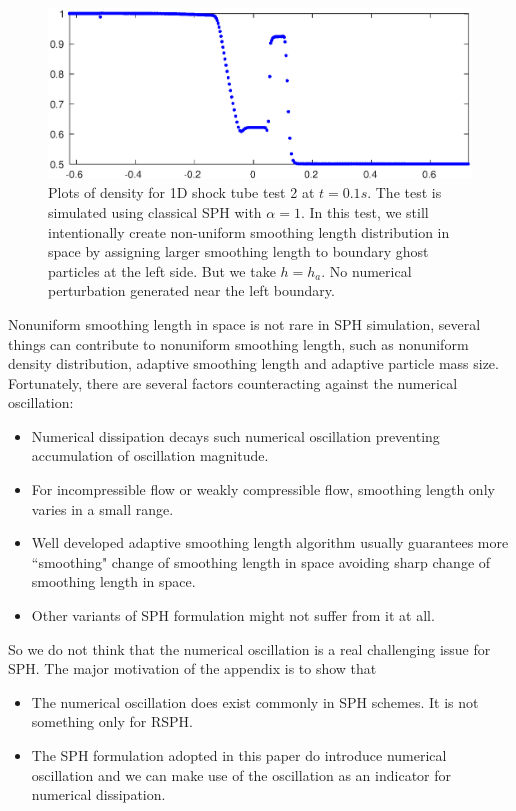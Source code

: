 \documentclass[preprint,12pt,authoryear]{elsarticle}
\begin{document}
\begin{figure}[H]
\centering
\includegraphics[width=0.90 \textwidth]{App-Figure/Perturbation-ME0-tp1}
\caption{Plots of density for 1D shock tube test 2 at $t=0.1s$. The test is simulated using classical SPH with $\alpha = 1$. In this test, we still intentionally create non-uniform smoothing length distribution in space by assigning larger smoothing length to boundary ghost particles at the left side. But we take $h=h_a$. No numerical perturbation generated near the left boundary.}    
\label{fig:Perturbation-ME0-tp1}
\end{figure}



Nonuniform smoothing length in space is not rare in SPH simulation, several things can contribute to nonuniform smoothing length, such as nonuniform density distribution, adaptive smoothing length and adaptive particle mass size. Fortunately, there are several factors counteracting against the numerical oscillation:
\begin{itemize}
\item Numerical dissipation decays such numerical oscillation preventing accumulation of oscillation magnitude.
\item For incompressible flow or weakly compressible flow, smoothing length only varies in a small range.
\item Well developed adaptive smoothing length algorithm usually guarantees more ``smoothing" change of smoothing length in space avoiding sharp change of smoothing length in space.
\item Other variants of SPH formulation might not suffer from it at all.
\end{itemize}
So we do not think that the numerical oscillation is a real challenging issue for SPH. The major motivation of the appendix is to show that 
\begin{itemize}
\item The numerical oscillation does exist commonly in SPH schemes. It is not something only for RSPH.
\item The SPH formulation adopted in this paper do introduce numerical oscillation and we can make use of the oscillation as an indicator for numerical dissipation.
\end{itemize}
\section*{}
  

\end{document}

